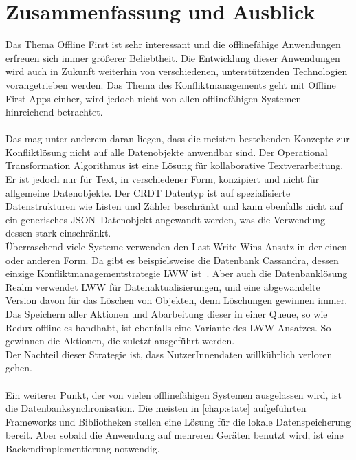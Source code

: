 \chapter{\label{chap:fazit}Zusammenfassung und Ausblick}
Das Thema Offline First ist sehr interessant und die offlinefähige Anwendungen erfreuen sich immer größerer Beliebtheit.
Die Entwicklung dieser Anwendungen wird auch in Zukunft weiterhin von verschiedenen, unterstützenden Technologien vorangetrieben werden.
Das Thema des Konfliktmanagements geht mit Offline First \glspl{App} einher, wird jedoch nicht von allen offlinefähigen Systemen hinreichend betrachtet.\\\\
Das mag unter anderem daran liegen, dass die meisten bestehenden Konzepte zur Konfliktlösung nicht auf alle Datenobjekte anwendbar sind.
Der Operational Transformation Algorithmus ist eine Lösung für kollaborative Textverarbeitung. Er ist jedoch nur für Text, in verschiedener Form, konzipiert und nicht für allgemeine Datenobjekte.
Der \gls{CRDT} Datentyp ist auf spezialisierte Datenstrukturen wie Listen und Zähler beschränkt und kann ebenfalls nicht auf ein generisches \gls{JSON}--Datenobjekt angewandt werden, was die Verwendung dessen stark einschränkt.\\
Überraschend viele Systeme verwenden den Last-Write-Wins Ansatz in der einen oder anderen Form.
Da gibt es beispielsweise die Datenbank Cassandra, dessen einzige Konfliktmanagementstrategie \gls{LWW} ist~\cite{cassandralww}.
Aber auch die Datenbanklösung Realm verwendet \gls{LWW} für Datenaktualisierungen, und eine abgewandelte Version davon für das Löschen von Objekten, denn Löschungen gewinnen immer.
Das Speichern aller Aktionen und Abarbeitung dieser in einer \gls{Queue}, so wie Redux offline es handhabt, ist ebenfalls eine Variante des \gls{LWW} Ansatzes. So gewinnen die Aktionen, die zuletzt ausgeführt werden.\\
Der Nachteil dieser Strategie ist, dass NutzerInnendaten willkührlich verloren gehen.\\\\
% 
% 
% 
Ein weiterer Punkt, der von vielen offlinefähigen Systemen ausgelassen wird, ist die Datenbanksynchronisation.
Die meisten in \autoref{chap:state} aufgeführten Frameworks und Bibliotheken stellen eine Lösung für die lokale Datenspeicherung bereit. 
Aber sobald die Anwendung auf mehreren Geräten benutzt wird, ist eine Backendimplementierung notwendig.
